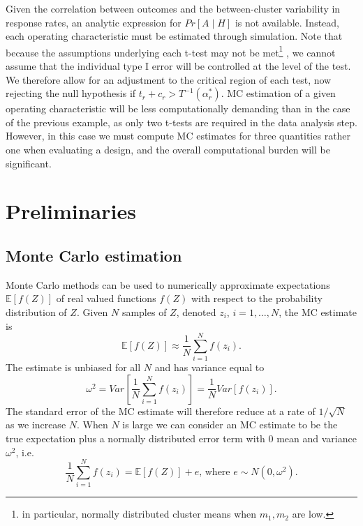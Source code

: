 \documentclass{article} %
\begin{document}
Given the correlation between outcomes and the between-cluster variability in response rates, an analytic expression for $Pr[A \mid H]$ is not available. Instead, each operating characteristic must be estimated through simulation. Note that because the assumptions underlying each t-test may not be met\footnote{
in particular, normally distributed cluster means when $m_{1}, m_{2}$ are low.}
, we cannot assume that the individual type I error will be controlled at the level of the test. We therefore allow for an adjustment to the critical region of each test, now rejecting the null hypothesis if $t_{r} + c_{r} > T^{-1}(\alpha_{r}^{*})$. MC estimation of a given operating characteristic will be less computationally demanding than in the case of the previous example, as only two t-tests are required in the data analysis step. However, in this case we must compute MC estimates for three quantities rather one when evaluating a design, and the overall computational burden will be significant.


\section{Preliminaries}\label{sec:prelim}

\subsection{Monte Carlo estimation}\label{sec:MC}

Monte Carlo methods can be used to numerically approximate expectations $\mathbb{E}[f(Z)]$ of real valued functions $f(Z)$ with respect to the probability distribution of $Z$. Given $N$ samples of $Z$, denoted $z_{i}$, $i=1,\ldots,N$, the MC estimate is
\begin{equation}
\mathbb{E}[f(Z)] \approx \frac{1}{N} \sum_{i=1}^{N} f(z_{i}).
\end{equation}
The estimate is unbiased for all $N$ and has variance equal to
\begin{equation}
\omega^{2} = Var[\frac{1}{N} \sum_{i=1}^{N} f(z_{i})] = \frac{1}{N} Var[f(z_{i})].
\end{equation}
The standard error of the MC estimate will therefore reduce at a rate of $1/\sqrt{N}$ as we increase $N$. When $N$ is large we can consider an MC estimate to be the true expectation plus a normally distributed error term with 0 mean and variance $\omega^{2}$, i.e.
\begin{equation}\label{eqn:MC_error}
\frac{1}{N} \sum_{i=1}^{N} f(z_{i}) = \mathbb{E}[f(Z)] + e \text{, where } e \sim N(0, \omega^{2}).
\end{equation}
\end{document}
